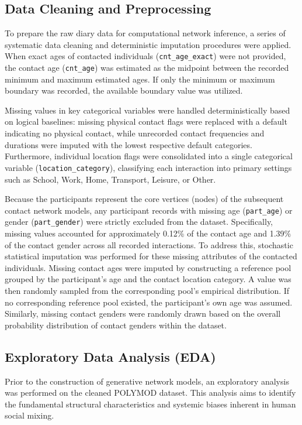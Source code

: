 \subsection{Data Cleaning and Preprocessing}
\label{subsec:data_cleaning}
To prepare the raw diary data for computational network inference, a series of systematic data cleaning and deterministic imputation procedures were applied. 
When exact ages of contacted individuals (\texttt{cnt\_age\_exact}) were not provided, the contact age (\texttt{cnt\_age}) was estimated as the midpoint between the recorded minimum and maximum estimated ages.
If only the minimum or maximum boundary was recorded, the available boundary value was utilized.

Missing values in key categorical variables were handled deterministically based on logical baselines: missing physical contact flags were replaced with a default indicating no physical contact, while unrecorded contact frequencies and durations were imputed with the lowest respective default categories.
Furthermore, individual location flags were consolidated into a single categorical variable (\texttt{location\_category}), classifying each interaction into primary settings such as School, Work, Home, Transport, Leisure, or Other.

Because the participants represent the core vertices (nodes) of the subsequent contact network models, any participant records with missing age (\texttt{part\_age}) or gender (\texttt{part\_gender}) were strictly excluded from the dataset.
Specifically, missing values accounted for approximately 0.12\% of the contact age and 1.39\% of the contact gender across all recorded interactions.
To address this, stochastic statistical imputation was performed for these missing attributes of the contacted individuals. 
Missing contact ages were imputed by constructing a reference pool grouped by the participant's age and the contact location category.
A value was then randomly sampled from the corresponding pool's empirical distribution.
If no corresponding reference pool existed, the participant's own age was assumed.
Similarly, missing contact genders were randomly drawn based on the overall probability distribution of contact genders within the dataset.


\subsection{Exploratory Data Analysis (EDA)}
\label{subsec:eda}

Prior to the construction of generative network models, an exploratory analysis was performed on the cleaned POLYMOD dataset.
This analysis aims to identify the fundamental structural characteristics and systemic biases inherent in human social mixing.

